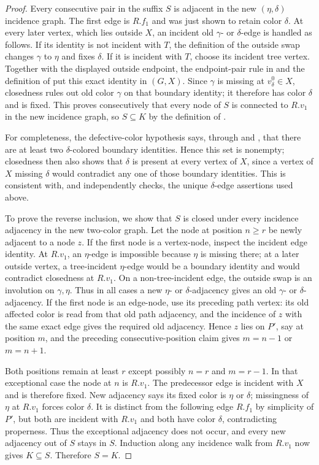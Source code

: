 \begin{proof}
Every consecutive pair in the suffix $S$ is adjacent in the new
$(\eta,\delta)$ incidence graph.  The first edge is $R.f_1$ and was just
shown to retain color $\delta$.  At every later vertex, which lies outside
$X$, an incident old $\gamma$- or $\delta$-edge is handled as follows.
If its identity is not incident with $T$, the definition of the outside
swap changes $\gamma$ to $\eta$ and fixes $\delta$.  If it is incident
with $T$, choose its incident tree vertex.  Together with the displayed
outside endpoint, the endpoint-pair rule in
 and the definition of
 put this exact identity in
$(G,X)$.  Since $\gamma$ is missing at
$v^0_\delta\in X$, closedness rules out old color $\gamma$ on that
boundary identity; it therefore has color $\delta$ and is fixed.  This
proves consecutively that every node of $S$ is connected to $R.v_1$ in
the new incidence graph, so $S\subseteq K$ by the definition of
.

For completeness, the defective-color hypothesis says, through
 and , that there
are at least two $\delta$-colored boundary identities.  Hence this set is
nonempty; closedness then also shows that $\delta$ is present at every
vertex of $X$, since a vertex of $X$ missing $\delta$ would contradict
any one of those boundary identities.  This is consistent with, and
independently checks, the unique $\delta$-edge assertions used above.

To prove the reverse inclusion, we show that $S$ is closed under every
incidence adjacency in the new two-color graph.  Let the node at position
$n\ge r$ be newly adjacent to a node $z$.  If the first node is a
vertex-node, inspect the incident edge identity.  At $R.v_1$, an
$\eta$-edge is impossible because $\eta$ is missing there; at a later
outside vertex, a tree-incident $\eta$-edge would be a boundary identity
and would contradict closedness at $R.v_1$.  On a non-tree-incident edge,
the outside swap is an involution on $\gamma,\eta$.  Thus in all cases a
new $\eta$- or $\delta$-adjacency gives an old
$\gamma$- or $\delta$-adjacency.  If the first node is an edge-node, use
its preceding path vertex: its old affected color is read from that old
path adjacency, and the incidence of $z$ with the same exact edge gives
the required old adjacency.  Hence $z$ lies on $P'$, say at position
$m$, and the preceding consecutive-position claim gives
$m=n-1$ or $m=n+1$.

Both positions remain at least $r$ except possibly $n=r$ and $m=r-1$.
In that exceptional case the node at $n$ is $R.v_1$.  The predecessor
edge is incident with $X$ and is therefore fixed.  New adjacency says its
fixed color is $\eta$ or $\delta$; missingness of $\eta$ at $R.v_1$
forces color $\delta$.  It is distinct from the following edge $R.f_1$
by simplicity of $P'$, but both are incident with $R.v_1$ and both have
color $\delta$, contradicting properness.  Thus the exceptional adjacency
does not occur, and every new adjacency out of $S$ stays in $S$.  Induction
along any incidence walk from $R.v_1$ now gives $K\subseteq S$.  Therefore
$S=K$.


\end{proof}
